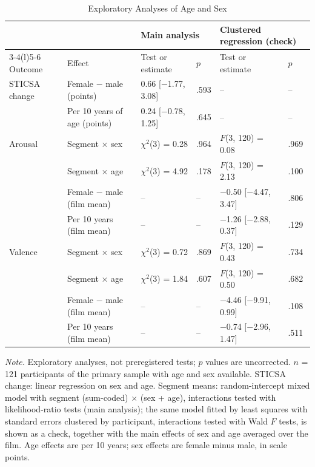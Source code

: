 \begin{table}[tbp]
\caption{Exploratory Analyses of Age and Sex}
\label{tab:agesex}
\begin{threeparttable}
\footnotesize\linespread{1}\selectfont\setlength{\tabcolsep}{3.5pt}
\begin{tabular}{@{}llllll@{}}
\toprule
 & & \multicolumn{2}{l}{Main analysis} & \multicolumn{2}{l}{Clustered regression (check)} \\
\cmidrule(lr){3-4}\cmidrule(l){5-6}
Outcome & Effect & Test or estimate & $p$ & Test or estimate & $p$ \\
\midrule
STICSA change & Female $-$ male (points) & 0.66 [$-$1.77, 3.08] & .593 & -- & -- \\
 & Per 10 years of age (points) & 0.24 [$-$0.78, 1.25] & .645 & -- & -- \\
\addlinespace
Arousal & Segment $\times$ sex & $\chi^2$(3) = 0.28 & .964 & $F$(3, 120) = 0.08 & .969 \\
 & Segment $\times$ age & $\chi^2$(3) = 4.92 & .178 & $F$(3, 120) = 2.13 & .100 \\
 & Female $-$ male (film mean) & -- & -- & $-$0.50 [$-$4.47, 3.47] & .806 \\
 & Per 10 years (film mean) & -- & -- & $-$1.26 [$-$2.88, 0.37] & .129 \\
\addlinespace
Valence & Segment $\times$ sex & $\chi^2$(3) = 0.72 & .869 & $F$(3, 120) = 0.43 & .734 \\
 & Segment $\times$ age & $\chi^2$(3) = 1.84 & .607 & $F$(3, 120) = 0.50 & .682 \\
 & Female $-$ male (film mean) & -- & -- & $-$4.46 [$-$9.91, 0.99] & .108 \\
 & Per 10 years (film mean) & -- & -- & $-$0.74 [$-$2.96, 1.47] & .511 \\
\bottomrule
\end{tabular}
\vspace{4pt}
\begin{tablenotes}
{\small\textit{Note.} Exploratory analyses, not preregistered tests; $p$ values are uncorrected. $n$ = 121 participants of the primary sample with age and sex available. STICSA change: linear regression on sex and age. Segment means: random-intercept mixed model with segment (sum-coded) $\times$ (sex + age), interactions tested with likelihood-ratio tests (main analysis); the same model fitted by least squares with standard errors clustered by participant, interactions tested with Wald $F$ tests, is shown as a check, together with the main effects of sex and age averaged over the film. Age effects are per 10 years; sex effects are female minus male, in scale points.}
\end{tablenotes}
\end{threeparttable}
\end{table}
